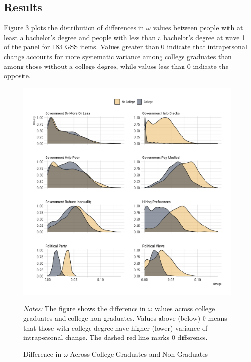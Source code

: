 \documentclass[
  11pt,
]{article}
\begin{document}
\subsection{Results}\label{results-1}

Figure 3 plots the distribution of differences in \(\omega\) values
between people with at least a bachelor's degree and people with less
than a bachelor's degree at wave 1 of the panel for 183 GSS items.
Values greater than 0 indicate that intrapersonal change accounts for
more systematic variance among college graduates than among those
without a college degree, while values less than 0 indicate the
opposite.

\begin{figure}[ht]
\begin{center}
\caption{Difference in $\omega$ Across College Graduates and Non-Graduates}

\begin{center}\includegraphics[width=62.5in]{../../figures/colleges} \end{center}

\end{center}
\footnotesize{\textit{Notes:} The figure shows the difference in $\omega$ values across college graduates and college non-graduates. Values above (below) 0 means that those with college degree have higher (lower) variance of intrapersonal change. The dashed red line marks 0 difference.}
\end{figure}
\end{document}
